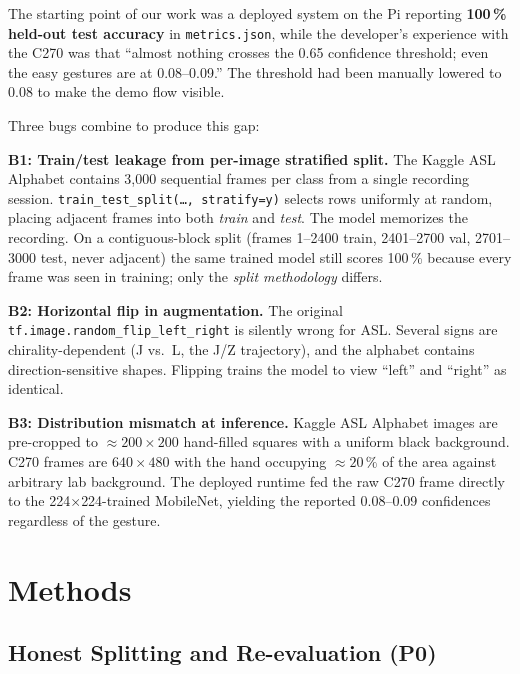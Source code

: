 \documentclass[sigconf,nonacm]{acmart}
\begin{document}
The starting point of our work was a deployed system on the Pi reporting
\textbf{100\,\% held-out test accuracy} in \texttt{metrics.json}, while
the developer's experience with the C270 was that ``almost nothing
crosses the 0.65 confidence threshold; even the easy gestures are at
0.08--0.09.''  The threshold had been manually lowered to 0.08 to make
the demo flow visible.

Three bugs combine to produce this gap:

\textbf{B1: Train/test leakage from per-image stratified split.}
The Kaggle ASL Alphabet contains 3,000 sequential frames per class from
a single recording session.  \texttt{train\_test\_split(\ldots,
stratify=y)} selects rows uniformly at random, placing adjacent frames
into both \emph{train} and \emph{test}.  The model memorizes the
recording.  On a contiguous-block split (frames 1--2400 train,
2401--2700 val, 2701--3000 test, never adjacent) the same trained model
still scores 100\,\% because every frame was seen in training; only the
\emph{split methodology} differs.

\textbf{B2: Horizontal flip in augmentation.}
The original \texttt{tf.image.random\_flip\_left\_right} is silently
wrong for ASL.  Several signs are chirality-dependent (J vs.\ L, the
J/Z trajectory), and the alphabet contains direction-sensitive shapes.
Flipping trains the model to view ``left'' and ``right'' as identical.

\textbf{B3: Distribution mismatch at inference.}
Kaggle ASL Alphabet images are pre-cropped to ${\approx}200{\times}200$
hand-filled squares with a uniform black background.  C270 frames are
$640{\times}480$ with the hand occupying ${\approx}20\,\%$ of the area
against arbitrary lab background.  The deployed runtime fed the raw
C270 frame directly to the 224${\times}$224-trained MobileNet, yielding
the reported 0.08--0.09 confidences regardless of the gesture.

\section{Methods}
\label{sec:methods}

\subsection{Honest Splitting and Re-evaluation (P0)}
\end{document}
